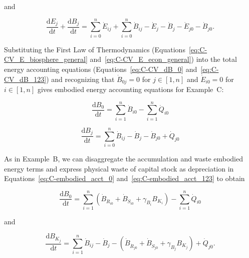 \noindent and

\begin{equation} \label{eq:C-CV_dB_123}
	\frac{\mathrm{d}E_{j}}{\mathrm{d}t}
	+ \frac{\mathrm{d}B_{j}}{\mathrm{d}t} 	 
	= \sum\limits_{i=0}^{n} \dot{E}_{ij}
	+ \sum\limits_{i=0}^{n} \dot{B}_{ij}
	- \dot{E}_{j}
	- \dot{B}_{j}
	- \dot{E}_{j0}
	- \dot{B}_{j0}.
\end{equation}

Substituting the First Law of Thermodynamics 
(Equations~\ref{eq:C-CV_E_biosphere_general} and~\ref{eq:C-CV_E_econ_general}) 
into the total energy accounting equations 
(Equations~\ref{eq:C-CV_dB_0} and~\ref{eq:C-CV_dB_123}) 
and recognizing that $\dot{B}_{0j} = 0$ for $j \in [1, n]$
and $\dot{E}_{i0} = 0$ for $i \in [1, n]$
gives embodied energy accounting equations for Example~C: %

\begin{equation} \label{eq:C-embodied_acct_0}
	\frac{\mathrm{d}B_{0}}{\mathrm{d}t} 	 
	= \sum\limits_{i=1}^{n} \dot{B}_{i0}
	- \sum\limits_{i=1}^{n} \dot{Q}_{i0}
\end{equation}

\begin{equation} \label{eq:C-embodied_acct_123}
	\frac{\mathrm{d}B_{j}}{\mathrm{d}t} 	 
	= \sum\limits_{i=0}^{n} \dot{B}_{ij}
	- \dot{B}_{j}
	- \dot{B}_{j0}
	+ \dot{Q}_{j0} 
\end{equation}

As in Example~B, 
we can disaggregate the accumulation and waste embodied energy terms 
and express physical waste of capital stock as depreciation 
in Equations~\ref{eq:C-embodied_acct_0}
and~\ref{eq:C-embodied_acct_123}
to obtain

\begin{equation} \label{eq:C_embodied_energy_accounting_0_with_depreciation}
	\frac{\mathrm{d}B_{0}}{\mathrm{d}t} 
	= \sum\limits_{i=1}^n 
		\left( \dot{B}_{\dot{R}_{i0}} 
				+ \dot{B}_{\dot{S}_{i0}} 
				+ \gamma_{B_{i}} B_{K_{i}} \right)
	- \sum\limits_{i=1}^n\dot{Q}_{i0} 
\end{equation}

\noindent and

\begin{equation} \label{eq:C_embodied_energy_accounting_123_with_depreciation}
	\frac{\mathrm{d}B_{K_{j}}}{\mathrm{d}t} 
	= \sum\limits_{i=1}^n\dot{B}_{ij} 
	- \dot{B}_{j}
	- \left( \dot{B}_{\dot{R}_{j0}}
		+ \dot{B}_{\dot{S}_{j0}}
		+ \gamma_{B_{j}} B_{K_{j}} \right)
	+ \dot{Q}_{j0}.
\end{equation}

